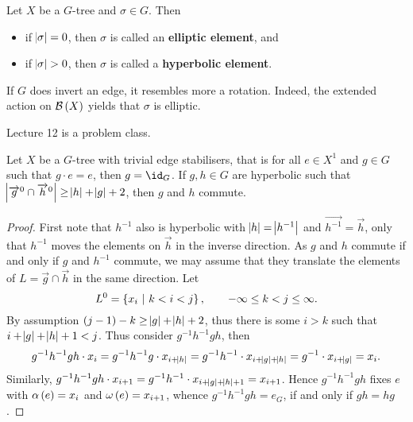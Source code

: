 \begin{definition}
Let $ X $ be a $ G $-tree and $ \sigma \in G $. Then
\begin{itemize}
\item if $ \abs{\sigma} = 0 $, then $ \sigma $ is called an \textbf{elliptic element}, and
\item if $ \abs{\sigma} > 0 $, then $ \sigma $ is called a \textbf{hyperbolic element}.
\end{itemize}
\end{definition}

\pagebreak

\begin{remark}
If $ G $ does invert an edge, it resembles more a rotation. Indeed, the extended action on $ \BBB\br{X} $ yields that $ \sigma $ is elliptic.
\end{remark}


Lecture 12 is a problem class.


\begin{lemma}
Let $ X $ be a $ G $-tree with trivial edge stabilisers, that is for all $ e \in X^1 $ and $ g \in G $ such that $ g \cdot e = e $, then $ g = \id_G $. If $ g, h \in G $ are hyperbolic such that $ \abs{\overrightarrow{g}^0 \cap \overrightarrow{h}^0} \ge \abs{h} + \abs{g} + 2 $, then $ g $ and $ h $ commute.
\end{lemma}

\begin{proof}
First note that $ h^{-1} $ also is hyperbolic with $ \abs{h} = \abs{h^{-1}} $ and $ \overrightarrow{h^{-1}} = \overrightarrow{h} $, only that $ h^{-1} $ moves the elements on $ \overrightarrow{h} $ in the inverse direction. As $ g $ and $ h $ commute if and only if $ g $ and $ h^{-1} $ commute, we may assume that they translate the elements of $ L = \overrightarrow{g} \cap \overrightarrow{h} $ in the same direction. Let
$$ L^0 = \cbr{x_i \st k < i < j}, \qquad -\infty \le k < j \le \infty. $$
By assumption $ \br{j - 1} - k \ge \abs{g} + \abs{h} + 2 $, thus there is some $ i > k $ such that $ i + \abs{g} + \abs{h} + 1 < j $. Thus consider $ g^{-1}h^{-1}gh $, then
$$ g^{-1}h^{-1}gh \cdot x_i = g^{-1}h^{-1}g \cdot x_{i + \abs{h}} = g^{-1}h^{-1} \cdot x_{i + \abs{g} + \abs{h}} = g^{-1} \cdot x_{i + \abs{g}} = x_i. $$
Similarly, $ g^{-1}h^{-1}gh \cdot x_{i + 1} = g^{-1}h^{-1} \cdot x_{i + \abs{g} + \abs{h} + 1} = x_{i + 1} $. Hence $ g^{-1}h^{-1}gh $ fixes $ e $ with $ \alpha\br{e} = x_i $ and $ \omega\br{e} = x_{i + 1} $, whence $ g^{-1}h^{-1}gh = e_G $, if and only if $ gh = hg $.
\end{proof}

